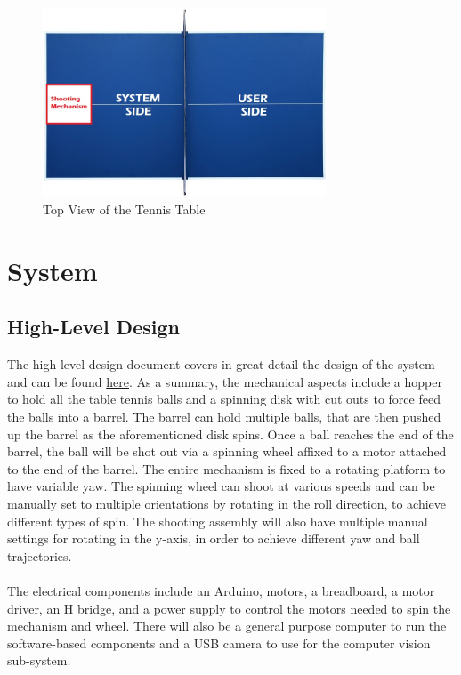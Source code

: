 \documentclass[11pt]{article}
\begin{document}
\begin{figure}[H]
   \centering
   \includegraphics[width=0.75\textwidth]{img/Table-Tennis-Top-View.png}
   \caption{Top View of the Tennis Table}
   \label{fig:table-tennis-top-view}
\end{figure}

\section{System}
\subsection{High-Level Design}
The high-level design document covers in great detail the design of the system and can be found \href{run:../SystemDesign/Design.pdf}{here}. As a summary, the mechanical aspects include a hopper to hold all the table tennis balls and a spinning disk with cut outs to force feed the balls into a barrel. The barrel can hold multiple balls, that are then pushed up the barrel as the aforementioned disk spins. Once a ball reaches the end of the barrel, the ball will be shot out via a spinning wheel affixed to a motor attached to the end of the barrel. The entire mechanism is fixed to a rotating platform to have variable yaw. The spinning wheel can shoot at various speeds and can be manually set to multiple orientations by rotating in the roll direction, to achieve different types of spin. The shooting assembly will also have multiple manual settings for rotating in the y-axis, in order to achieve different yaw and ball trajectories.  \\ \\
The electrical components include an Arduino, motors, a breadboard, a motor driver, an H bridge, and a power supply to control the motors needed to spin the mechanism and wheel. There will also be a general purpose computer to run the software-based components and a USB camera to use for the computer vision sub-system. 
\end{document}
